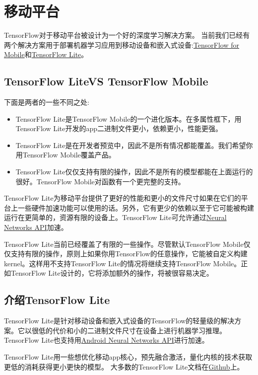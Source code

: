 \section{移动平台}
TensorFlow对于移动平台被设计为一个好的深度学习解决方案。
当前我们已经有两个解决方案用于部署机器学习应用到移动设备和嵌入式设备:\href{https://www.tensorflow.org/mobile/mobile_intro?hl=zh-cn}{TensorFlow for Mobile}和\href{https://www.tensorflow.org/mobile/tflite/index?hl=zh-cn}{TensorFlow Lite}。
\subsection{TensorFlow LiteVS TensorFlow Mobile}
下面是两者的一些不同之处:
\begin{itemize}
\item TensorFlow Lite是TensorFlow Mobile的一个进化版本。在多属性框下，用TensorFlow Lite开发的app二进制文件更小，依赖更小，性能更强。
\item TensorFlow Lite是在开发者预览中，因此不是所有情况都能覆盖。我们希望你用TensorFlow Mobile覆盖产品。
\item TensorFlow Lite仅仅支持有限的操作，因此不是所有的模型都能在上面运行的很好。TensorFlow Mobile对函数有一个更完整的支持。
\end{itemize}
TensorFlow Lite为移动平台提供了更好的性能和更小的文件尺寸如果在它们的平台上一些硬件加速功能可以使用的话。另外，它有更少的依赖以至于它可能被构建运行在更简单的，资源有限的设备上。TensorFlow Lite可允许通过\href{https://developer.android.com/ndk/guides/neuralnetworks/index.html?hl=zh-cn}{Neural Networks API}加速。

TensorFlow Lite当前已经覆盖了有限的一些操作。尽管默认TensorFlow Mobile仅仅支持有限的操作，原则上如果你用TensorFlow的任意操作，它能被自定义构建kernel。这样用不支持TensorFlow Lite的情况将继续支持TensorFlow Mobile。正如TensorFlow Lite设计的，它将添加额外的操作，将被很容易决定。
\subsection{介绍TensorFlow Lite}
TensorFlow Lite是针对移动设备和嵌入式设备的TensorFlow的轻量级的解决方案。它以很低的代价和小的二进制文件尺寸在设备上进行机器学习推理。TensorFlow Lite也支持用\href{https://developer.android.com/ndk/guides/neuralnetworks/index.html?hl=zh-cn}{Android Neural Networks API}进行加速。

TensorFlow Lite用一些想优化移动app核心，预先融合激活，量化内核的技术获取更低的消耗获得更小更快的模型。
大多数的TensorFlow Lite文档在\href{https://github.com/tensorflow/tensorflow/tree/master/tensorflow/contrib/lite}{Github}上。
